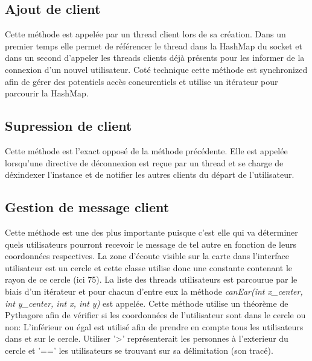 \documentclass[a4paper,12pt]{report}
\begin{document}
      \subsection{Ajout de client}
        \medbreak
        Cette méthode est appelée par un thread client lors de sa création. Dans un premier temps elle permet de référencer le thread dans la HashMap du socket et dans un second d'appeler les threads clients déjà présents pour les informer de la connexion d'un nouvel utilisateur.
        \medbreak
        Coté technique cette méthode est synchronized afin de gérer des potentiels accès concurentiels et utilise un itérateur pour parcourir la HashMap.

      \subsection{Supression de client}
        \medbreak
        Cette méthode est l'exact opposé de la méthode précédente. Elle est appelée lorsqu'une directive de déconnexion est reçue par un thread et se charge de déxindexer l'instance et de notifier les autres clients du départ de l'utilisateur.

      \subsection{Gestion de message client}
        \medbreak
        Cette méthode est une des plus importante puisque c'est elle qui va déterminer quels utilisateurs pourront recevoir le message de tel autre en fonction de leurs coordonnées respectives.
        \medbreak
        La zone d'écoute visible sur la carte dans l'interface utilisateur est un cercle et cette classe utilise donc une constante contenant le rayon de ce cercle (ici 75). La liste des threads utilisateurs est parcourue par le biais d'un itérateur et pour chacun d'entre eux la méthode \emph{canEar(int x\_center, int y\_center, int x, int y)} est appelée.
        \medbreak
        Cette méthode utilise un théorème de Pythagore afin de vérifier si les coordonnées de l'utilisateur sont dans le cercle ou non:
        \medbreak
        \medbreak
        L'inférieur ou égal est utilisé afin de prendre en compte tous les utilisateurs dans et sur le cercle. Utiliser '>' représenterait les personnes à l'exterieur du cercle et '==' les utilisateurs se trouvant sur sa délimitation (son tracé).
\end{document}

